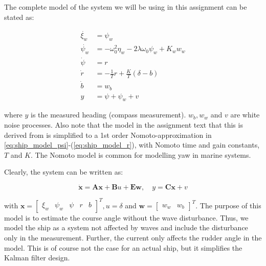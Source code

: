 The complete model of the system we will be using in this assignment can be stated as:

\begin{subequations} \label{eq:ship_model}
    \begin{align}
    \dot{\xi_w} &= \psi_w  \label{eq:ship_model_xi} \\
    \dot{\psi_w} &= -\omega_0^2 \eta_w - 2 \lambda \omega_0 \psi_w + K_w w_w \label{eq:ship_model_psi_w} \\
    \dot{\psi} &= r  \label{eq:ship_model_psi} \\
    \dot{r} &= - \frac{1}{T} r + \frac{K}{T} (\delta - b)  \label{eq:ship_model_r}\\
    \dot{b} &= w_b  \label{eq:ship_model_b} \\
    y &= \psi + \psi_w + v \label{eq:ship_model_y}
    \end{align}
\end{subequations}

where $y$ is the measured heading (compass measurement). $w_b, w_w$ and $v$ are white noise processes. Also note that the model in the assignment text that this is derived from is simplified to a 1st order Nomoto-approximation in \cref{eq:ship_model_psi}-(\ref{eq:ship_model_r}), with Nomoto time and gain constants, $T$ and $K$. The Nomoto model is common for modelling yaw in marine systems.

Clearly, the system can be written as:

\begin{equation} \label{eq:state_space}
    \mathbf{\dot{x}} = \mathbf{Ax} + \mathbf{B}u + \mathbf{Ew}, 
    \quad y = \mathbf{Cx} + v
\end{equation}

with $\mathbf{x} = \begin{bmatrix} \xi_w & \psi_w & \psi & r & b \end{bmatrix}^T, u = \delta$ and $\mathbf{w} = \begin{bmatrix} w_w & w_b \end{bmatrix}^T$. The purpose of this model is to estimate the course angle without the wave disturbance. Thus, we model the ship as a system not affected by waves and include the disturbance only in the measurement. Further, the current only affects the rudder angle in the model. This is of course not the case for an actual ship, but it simplifies the Kalman filter design.